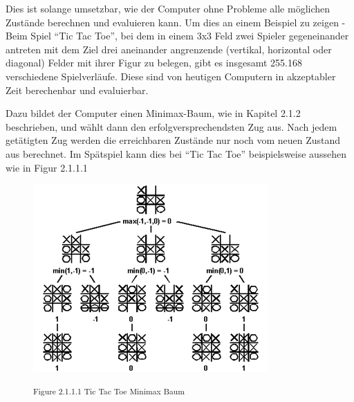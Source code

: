 Dies ist solange umsetzbar, wie der Computer ohne Probleme alle möglichen Zustände berechnen und evaluieren kann. Um dies an einem Beispiel zu zeigen - Beim Spiel ``Tic Tac Toe'', bei dem in einem 3x3 Feld zwei Spieler gegeneinander antreten mit dem Ziel drei aneinander angrenzende (vertikal, horizontal oder diagonal) Felder mit ihrer Figur zu belegen, gibt es insgesamt 255.168 verschiedene Spielverläufe. Diese sind von heutigen Computern in akzeptabler Zeit berechenbar und evaluierbar.


Dazu bildet der Computer einen Minimax-Baum, wie in Kapitel 2.1.2 beschrieben, und wählt dann den erfolgversprechendsten Zug aus. Nach jedem getätigten Zug werden die erreichbaren Zustände nur noch vom neuen Zustand aus berechnet. Im Spätspiel kann dies bei ``Tic Tac Toe'' beispielsweise aussehen wie in Figur 2.1.1.1

\begin{figure}[h]
\centering
\includegraphics[width=\textwidth/5*3]{images/tictactoe_minimax_tree.png}

\textsuperscript{Figure 2.1.1.1 Tic Tac Toe Minimax Baum \cite{}}\\
\end{figure}

